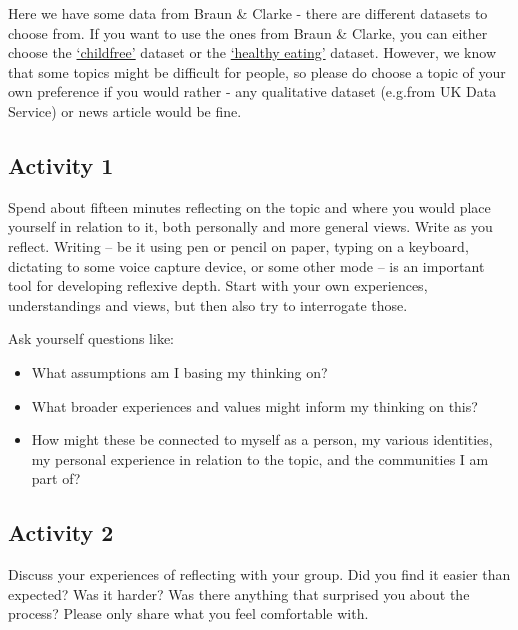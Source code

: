 \documentclass[
  english,
  letterpaper,
  DIV=11,
  numbers=noendperiod]{scrreprt}
\providecommand{\tightlist}{%
  \setlength{\itemsep}{0pt}\setlength{\parskip}{0pt}}
\begin{document}
Here we have some data from Braun \& Clarke - there are different
datasets to choose from. If you want to use the ones from Braun \&
Clarke, you can either choose the
\href{https://gla-my.sharepoint.com/:w:/g/personal/ashley_robertson_glasgow_ac_uk/EWq1HW7Xm_BKnobsU_GRpcIBlSvnQ4k6XhFqBkszClAwWg?e=q4lc97}{`childfree'}
dataset or the
\href{https://gla-my.sharepoint.com/:w:/g/personal/ashley_robertson_glasgow_ac_uk/EdfitbKwhodKo8Kmj9szNgwBNmt313A8dYknAiehHdy2lg?e=0vWOnu}{`healthy
eating'} dataset. However, we know that some topics might be difficult
for people, so please do choose a topic of your own preference if you
would rather - any qualitative dataset (e.g.from UK Data Service) or
news article would be fine.

\subsection{Activity 1}\label{activity-1}

Spend about fifteen minutes reflecting on the topic and where you would
place yourself in relation to it, both personally and more general
views. Write as you reflect. Writing -- be it using pen or pencil on
paper, typing on a keyboard, dictating to some voice capture device, or
some other mode -- is an important tool for developing reflexive depth.
Start with your own experiences, understandings and views, but then also
try to interrogate those.

Ask yourself questions like:

\begin{itemize}
\tightlist
\item
  What assumptions am I basing my thinking on?
\item
  What broader experiences and values might inform my thinking on this?
\item
  How might these be connected to myself as a person, my various
  identities, my personal experience in relation to the topic, and the
  communities I am part of?
\end{itemize}

\subsection{Activity 2}\label{activity-2}

Discuss your experiences of reflecting with your group. Did you find it
easier than expected? Was it harder? Was there anything that surprised
you about the process? Please only share what you feel comfortable with.
\end{document}
